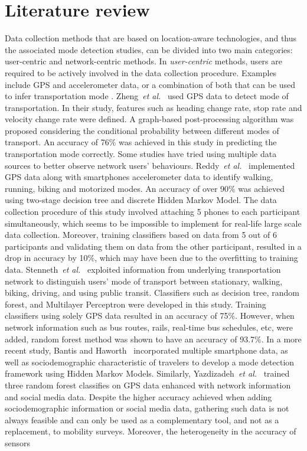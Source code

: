 \section{Literature review}
\label{S:w2}
Data collection methods that are based on location-aware technologies, and thus the associated mode detection studies, can be divided into two main categories: user-centric and network-centric methods. In \emph{user-centric} methods, users are required to be actively involved in the data collection procedure. Examples include GPS and accelerometer data, or a combination of both that can be used to infer transportation mode \cite{zheng2008understanding,reddy2008determining,stenneth2011transportation,endo2016deep,xiao2017identifying,dabiri2018inferring,efthymiou2019transportation}. 
Zheng~\textit{et al.}~\cite{zheng2008understanding} used GPS data to detect mode of transportation. In their study, features such as heading change rate, stop rate and velocity change rate were defined. A graph-based post-processing algorithm was proposed considering the conditional probability between different modes of transport. An accuracy of 76\% was achieved in this study in predicting the transportation mode correctly. Some studies have tried using multiple data sources to better observe network users' behaviours. Reddy~\textit{et al.}~\cite{reddy2008determining} implemented GPS data along with smartphones accelerometer data to identify walking, running, biking and motorized modes. An accuracy of over 90\% was achieved using two-stage decision tree and discrete Hidden Markov Model. The data collection procedure of this study involved attaching 5 phones to each participant simultaneously, which seems to be impossible to implement for real-life large scale data collection. Moreover, training classifiers based on data from 5 out of 6 participants and validating them on data from the other participant, resulted in a drop in accuracy by 10\%, which may have been due to the overfitting to training data. Stenneth~\textit{et al.}~\cite{stenneth2011transportation} exploited information from underlying transportation network to distinguish users' mode of transport between stationary, walking, biking, driving, and using public transit. Classifiers such as decision tree, random forest, and Multilayer Perceptron were developed in this study. Training classifiers using solely GPS data resulted in an accuracy of 75\%. However, when network information such as bus routes, rails, real-time bus schedules, etc, were added, random forest method was shown to have an accuracy of 93.7\%. In a more recent study, Bantis and Haworth~\cite{bantis2017you} incorporated multiple smartphone data, as well as sociodemographic characteristic of travelers to develop a mode detection framework using Hidden Markov Models. Similarly, Yazdizadeh~\textit{et al.}~\cite{yazdizadeh2019automated} trained three random forest classifies on GPS data enhanced with network information and social media data. Despite the higher accuracy achieved when adding sociodemographic information or social media data, gathering such data is not always feasible and can only be used as a complementary tool, and not as a replacement, to mobility surveys. Moreover, the heterogeneity in the accuracy of sensors 